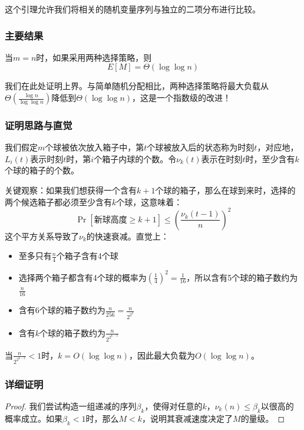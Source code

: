 \documentclass[lang=cn,newtx,10pt,scheme=chinese,chinesefont=nofont,citestyle=gb7714-2015, bibstyle=gb7714-2015]{elegantbook}
\begin{document}
\begin{refsection}
这个引理允许我们将相关的随机变量序列与独立的二项分布进行比较。

\subsubsection{主要结果}

\begin{theorem}
当$m=n$时，如果采用两种选择策略，则
\begin{equation}
E[M] = \Theta(\log\log n)
\end{equation}
\end{theorem}

我们在此处证明上界。与简单随机分配相比，两种选择策略将最大负载从$\Theta(\frac{\log n}{\log\log n})$降低到$\Theta(\log\log n)$，这是一个指数级的改进！

\subsubsection{证明思路与直觉}

我们假定$m$个球被依次放入箱子中，第$t$个球被放入后的状态称为时刻$t$，对应地，$L_i(t)$表示时刻$t$时，第$i$个箱子内球的个数。令$\nu_k(t)$表示在时刻$t$时，至少含有$k$个球的箱子的个数。

关键观察：如果我们想获得一个含有$k+1$个球的箱子，那么在球到来时，选择的两个候选箱子都必须至少含有$k$个球，这意味着：
\[
\Pr[\text{新球高度} \geq k + 1] \leq \left( \frac{\nu_k(t - 1)}{n} \right)^2
 \]
这个平方关系导致了$\nu_k$的快速衰减。直觉上：
\begin{itemize}
\item 至多只有$\frac{n}{4}$个箱子含有4个球
\item 选择两个箱子都含有4个球的概率为$(\frac{1}{4})^2=\frac{1}{16}$，所以含有5个球的箱子数约为$\frac{n}{16}$
\item 含有6个球的箱子数约为$\frac{n}{256}=\frac{n}{2^{2^3}}$
\item 含有$k$个球的箱子数约为$\frac{n}{2^{2^{k-3}}}$
\end{itemize}

当$\frac{n}{2^{2^{k-3}}}<1$时，$k=O(\log\log n)$，因此最大负载为$O(\log\log n)$。

\subsubsection{详细证明}

\begin{proof}
我们尝试构造一组递减的序列$\beta_k$，使得对任意的$k$，$\nu_k(n)\le \beta_k$以很高的概率成立。如果$\beta_k<1$时，那么$M<k$，说明其衰减速度决定了$M$的量级。


\end{proof}
\end{refsection}
\end{document}
